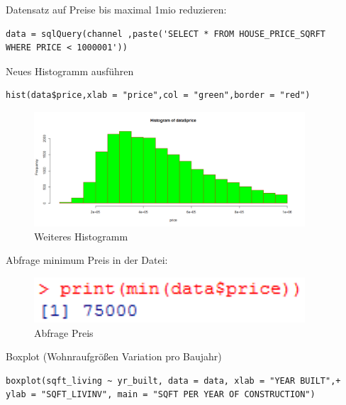 Datensatz auf Preise bis maximal 1mio reduzieren:
\begin{lstlisting}
data = sqlQuery(channel ,paste('SELECT * FROM HOUSE_PRICE_SQRFT                 WHERE PRICE < 1000001'))
\end{lstlisting}

        Neues Histogramm ausführen
\begin{lstlisting}
hist(data$price,xlab = "price",col = "green",border = "red")
\end{lstlisting}

\begin{figure}[!htb]
        \begin{minipage}{1\textwidth}
                \centering
                \includegraphics[width=0.90\textwidth]{pics/tutor4.png}\par\vspace{0cm}
                \caption{Weiteres Histogramm}
                \label{fig:tutor4}
        \end{minipage}
\end{figure}

Abfrage minimum Preis in der Datei:
\begin{figure}[!htb]
        \begin{minipage}{1\textwidth}
                \centering
                \includegraphics[width=0.90\textwidth]{pics/tutor4-1.png}\par\vspace{0cm}
                \caption{Abfrage Preis}
                \label{fig:tutor4-1}
        \end{minipage}
\end{figure}

Boxplot (Wohnraufgrößen Variation pro Baujahr)
\begin{lstlisting}
boxplot(sqft_living ~ yr_built, data = data, xlab = "YEAR BUILT",+    ylab = "SQFT_LIVINV", main = "SQFT PER YEAR OF CONSTRUCTION")
\end{lstlisting}


